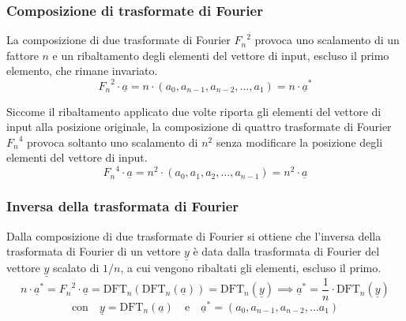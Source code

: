 \subsubsection*{Composizione di trasformate di Fourier}
La composizione di due trasformate di Fourier \({F_n}^2\) provoca uno scalamento di un fattore \(n\) e un ribaltamento degli
elementi del vettore di input, escluso il primo elemento, che rimane invariato.
\[{F_n}^2 \cdot \underline{a} = n \cdot (a_0, a_{n-1}, a_{n-2}, \dots, a_1) = n \cdot \underline{a}^*\]

\noindent
Siccome il ribaltamento applicato due volte riporta gli elementi del vettore di input alla posizione originale, la composizione
di quattro trasformate di Fourier \({F_n}^4\) provoca soltanto uno scalamento di \(n^2\) senza modificare la posizione degli
elementi del vettore di input.
\[{F_n}^4 \cdot \underline{a} = n^2 \cdot (a_0, a_1, a_2, \dots, a_{n-1}) = n^2 \cdot \underline{a}\]

\subsubsection*{Inversa della trasformata di Fourier}
Dalla composizione di due trasformate di Fourier si ottiene che l'inversa della trasformata di Fourier di un vettore
\(\underline{y}\) è data dalla trasformata di Fourier del vettore \(\underline{y}\) scalato di \(1/n\), a cui vengono
ribaltati gli elementi, escluso il primo.
\[n \cdot \underline{a}^* = {F_n}^2 \cdot \underline{a} = \text{DFT}_n(\text{DFT}_n(\underline{a})) = \text{DFT}_n(\underline{y}) \implies \underline{a}^* = \frac{1}{n} \cdot \text{DFT}_n(\underline{y}) \]
\[\text{con} \quad \underline{y} = \text{DFT}_n(\underline{a}) \quad \text{e} \quad \underline{a}^* = \left( a_0, a_{n-1}, a_{n-2}, \dots a_1 \right)\]
